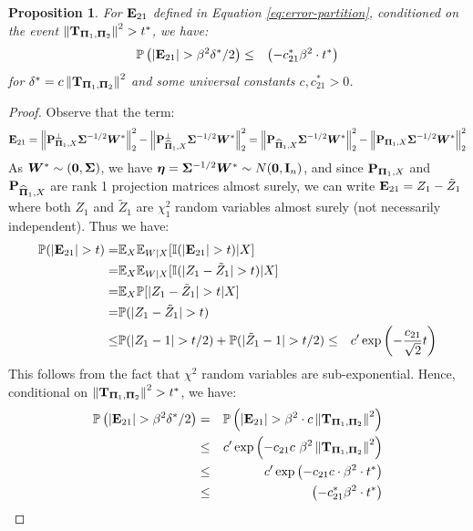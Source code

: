 \documentclass[numsec,webpdf,modern,medium,namedate]{oup-authoring-template}
\theoremstyle{thmstyleone}%
\newtheorem{proposition}{Proposition}
\theoremstyle{thmstyletwo}%
\theoremstyle{thmstylethree}%
\begin{document}
\begin{proposition}\label{prop:E21-dist-given-X}
    For $\mathbf{E}_{21}$ defined in Equation \ref{eq:error-partition}, conditioned on the event $\left\|\mathbf{T}_{\boldsymbol{\Pi}_1, \boldsymbol{\Pi}_2} \right\|^2 > t^\ast$, we have:
    \begin{eqnarray}\label{eq:E21-dist-given-X}
        \mathbb{P}\left(|\mathbf{E}_{21}| > \beta^2\delta^\ast/2\right) & \leq & \left(-c^\ast_{21}\beta^2\cdot t^\ast\right)
    \end{eqnarray}
    for $\delta^\ast = c\left\|\mathbf{T}_{\boldsymbol{\Pi}_1, \boldsymbol{\Pi}_2} \right\|^2$ and some universal constants $c,c^\ast_{21} > 0$.
\end{proposition}
\begin{proof}
Observe that the term: 
{\small
\begin{equation*}
\mathbf{E}_{21} = \left\| \mathbf{P}_{{\boldsymbol{\Pi}}_1, X}^\perp {\boldsymbol{\Sigma}}^{-1/2} \boldsymbol{W}^\ast \right\|_2^2 - \left\| \mathbf{P}_{\widehat{\boldsymbol{\Pi}}_1, X}^\perp {\boldsymbol{\Sigma}}^{-1/2} \boldsymbol{W}^\ast \right\|_2^2 = \left\| \mathbf{P}_{\widehat{\boldsymbol{\Pi}}_1, X} {\boldsymbol{\Sigma}}^{-1/2} \boldsymbol{W}^\ast \right\|_2^2 - \left\| \mathbf{P}_{{\boldsymbol{\Pi}}_1, X} {\boldsymbol{\Sigma}}^{-1/2} \boldsymbol{W}^\ast \right\|_2^2
\end{equation*}}
As $\boldsymbol{W}^\ast \sim(\boldsymbol{0}, {\boldsymbol{\Sigma}})$, we have $\boldsymbol{\eta} = {\boldsymbol{\Sigma}}^{-1/2}\boldsymbol{W}^\ast\sim N(\boldsymbol{0},\mathbf{I}_n) $, and since $\mathbf{P}_{{\boldsymbol{\Pi}}_1, X}$ and $\mathbf{P}_{\widehat{\boldsymbol{\Pi}}_1, X}$ are rank 1 projection matrices almost surely, we can write $\mathbf{E}_{21} = Z_1 - \tilde{Z}_1$ where both $Z_1$ and $\tilde{Z}_1$ are $\chi^2_1$ random variables almost surely (not necessarily independent). Thus we have:
$$
\begin{aligned}
    \Prob(|\bE_{21}| >t) = & \E_{X}\E_{W|X}[\mathbb{I}(|\bE_{21}| >t)|X]\\
    = &\E_{X}\E_{W|X}[\mathbb{I}(|Z_1 - \tilde{Z}_1| >t)|X]\\
    = & \E_{X}\Prob[|Z_1 - \tilde{Z}_1| >t|X]\\
    = & \Prob(|Z_1 - \tilde{Z}_1| >t)\\
    \leq & \Prob(|Z_1 - 1|> t/2) + \Prob(|\tilde{Z}_1 - 1|> t/2)
    \leq & c^\prime \exp\left(- \dfrac{c_{21}}{\sqrt{2}}t\right)
\end{aligned}
$$
This follows from the fact that $\chi^2$ random variables are sub-exponential. Hence, conditional on $\left\|\mathbf{T}_{\boldsymbol{\Pi}_1, \boldsymbol{\Pi}_2} \right\|^2>t^\ast$, we have:
\begin{eqnarray*}
    \mathbb{P}\left(|\mathbf{E}_{21}| > \beta^2\delta^\ast/2\right) & = &  \mathbb{P}\left(|\mathbf{E}_{21}| > \beta^2 \cdot c\left\|\mathbf{T}_{\boldsymbol{\Pi}_1, \boldsymbol{\Pi}_2} \right\|^2\right)\\
    & \leq & c'\exp\left(-{c_{21}c}\ \beta^2 \left\|\mathbf{T}_{\boldsymbol{\Pi}_1, \boldsymbol{\Pi}_2} \right\|^2\right)\\
    & \leq & c'\exp\left(-c_{21}c\cdot\beta^2\cdot t^\ast\right)\\
    & \leq & \left(-c^\ast_{21}\beta^2\cdot t^\ast\right)
\end{eqnarray*}

\end{proof}
\end{document}
